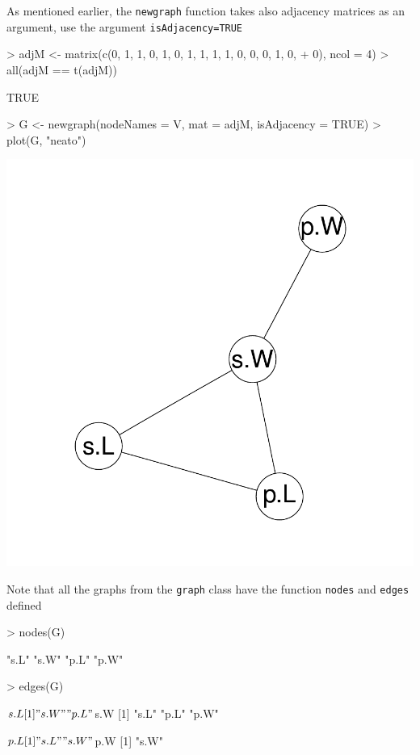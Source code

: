 \documentclass[12pt,oneside,titlepage,letter]{article}
\begin{document}
As mentioned earlier, the \texttt{newgraph} function takes also adjacency matrices as an argument, use the argument \texttt{isAdjacency=TRUE}
\begin{center}
\begin{Schunk}
\begin{Sinput}
> adjM <- matrix(c(0, 1, 1, 0, 1, 0, 1, 1, 1, 1, 0, 0, 0, 1, 0, 
+     0), ncol = 4)
> all(adjM == t(adjM))
\end{Sinput}
\begin{Soutput}
[1] TRUE
\end{Soutput}
\begin{Sinput}
> G <- newgraph(nodeNames = V, mat = adjM, isAdjacency = TRUE)
> plot(G, "neato")
\end{Sinput}
\end{Schunk}
\includegraphics{sweave_p-038}
\end{center}
Note that all the graphs from the \texttt{graph} class have the function \texttt{nodes} and \texttt{edges} defined
\begin{Schunk}
\begin{Sinput}
> nodes(G)
\end{Sinput}
\begin{Soutput}
[1] "s.L" "s.W" "p.L" "p.W"
\end{Soutput}
\begin{Sinput}
> edges(G)
\end{Sinput}
\begin{Soutput}
$s.L
[1] "s.W" "p.L"

$s.W
[1] "s.L" "p.L" "p.W"

$p.L
[1] "s.L" "s.W"

$p.W
[1] "s.W"
\end{Soutput}
\end{Schunk}
\end{document}
